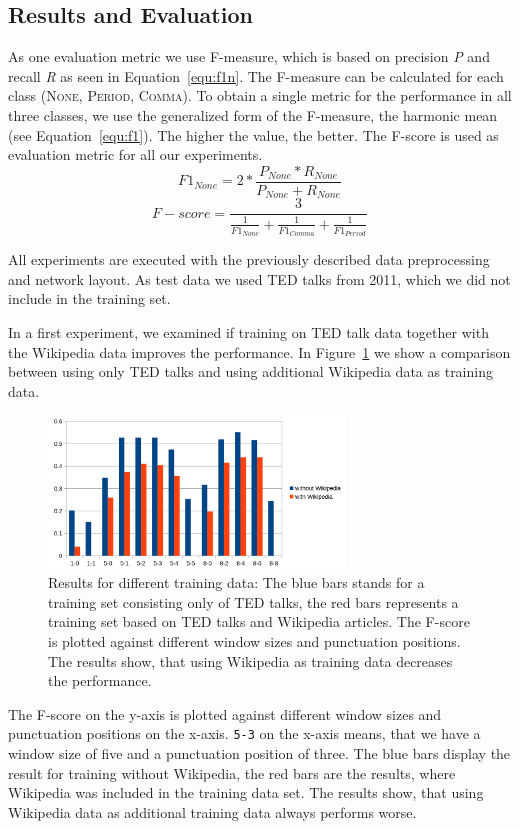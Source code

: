 \subsection{Results and Evaluation}

As one evaluation metric we use F-measure, which is based on precision \emph{P} and recall \emph{R} as seen in Equation~\ref{equ:f1n}.
The F-measure can be calculated for each class (\textsc{None}, \textsc{Period}, \textsc{Comma}).
To obtain a single metric for the performance in all three classes, we use the generalized form of the F-measure, the harmonic mean (see Equation~\ref{equ:f1}).
The higher the value, the better.
The F-score is used as evaluation metric for all our experiments.
\begin{equation}
\label{equ:f1n}
F1_{None} = 2 * \frac{P_{None}* R_{None}}{P_{None}+R_{None}}
\end{equation}
\begin{equation}
\label{equ:f1}
F-score = \frac{3}{\frac{1}{F1_{None}} + \frac{1}{F1_{Comma}} + \frac{1}{F1_{Period}}}
\end{equation}

All experiments are executed with the previously described data preprocessing and network layout.
As test data we used TED talks from 2011, which we did not include in the training set.

In a first experiment, we examined if training on TED talk data together with the Wikipedia data improves the performance. 
In Figure~\ref{fig:window_wiki_eval} we show a comparison between using only TED talks and using additional Wikipedia data as training data.
\begin{figure}[ht]
    \centering
    \includegraphics[width=0.7\textwidth]{img/window_wiki_eval.png}
    \caption{Results for different training data: The blue bars stands for a training set consisting only of TED talks, the red bars represents a training set based on TED talks and Wikipedia articles. The F-score is plotted against different window sizes and punctuation positions. The results show, that using Wikipedia as training data decreases the performance.}
    \label{fig:window_wiki_eval}
\end{figure}
The F-score on the y-axis is plotted against different window sizes and punctuation positions on the x-axis.
\texttt{5-3} on the x-axis means, that we have a window size of five and a punctuation position of three.
The blue bars display the result for training without Wikipedia, the red bars are the results, where Wikipedia was included in the training data set.
The results show, that using Wikipedia data as additional training data always performs worse.

